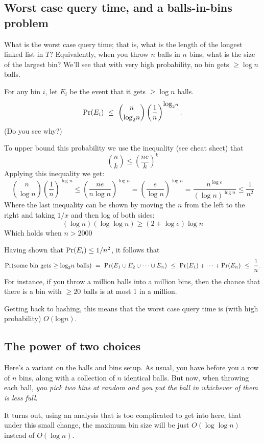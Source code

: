 \subsection{Worst case query time, and a balls-in-bins problem}

What is the worst case query time; that is, what is the length of the
longest linked list in $T$? Equivalently, when you throw $n$ balls in
$n$ bins, what is the size of the largest bin? We'll see that with
very high probability, no bin gets $\geq \log n$ balls.

For any bin $i$, let $E_i$ be the event that it gets $\geq \log n$ balls.
$$ \mbox{\rm Pr}(E_i) \  \leq \ {n \choose \mbox{log}_2 n} \left( \frac{1}{n} \right)^{\mbox{log}_2 n} .$$
(Do you see why?) 

To upper bound this probability we use the inequality (see cheat sheet) that
\[
{n \choose k} \leq \left( \frac{ne}{k} \right)^k
\]
Applying this inequality we get:
\[
{n \choose \log n} \left( \frac{1}{n} \right)^{\log n} \leq 
\left( \frac{ne}{n \log n}  \right)^{\log n} =
\left( \frac{e}{\log n}  \right)^{\log n} =
\frac{n^{\log e}}{(\log n)^{\log n}} \leq \frac{1}{n^2}
\]
Where the last inequality can be shown by moving the $n$ from the left
to the right and taking $1/x$ and then log of both sides:
\[
(\log n)(\log \log n) \geq (2+\log e) \log n
\]
Which holds when $n>2000$

Having shown that $\mbox{\rm Pr}(E_i) \leq 1/n^2$, it follows that
$$ \pr(\mbox{some bin gets $\geq \log n$ balls})
\ = \ 
\pr(E_1 \cup E_2 \cup \cdots \cup E_n)
\ \leq \ 
\pr(E_1) + \cdots + \pr(E_n) 
\ \leq \ 
\frac{1}{n}.
$$
For instance, if you throw a million balls into a million bins, then the chance that
there is a bin with $\geq 20$ balls is at most 1 in a million.

Getting back to hashing, this means that the worst case query time is (with high
probability) $O(\mbox{log} n)$.

\subsection{The power of two choices}

Here's a variant on the balls and bins setup. As usual, you have before you a 
row of $n$ bins, along with a collection of $n$ identical balls. But now, 
when throwing each ball, {\it you pick two bins at random and you put the
ball in whichever of them is less full}.

It turns out, using an analysis that is too complicated to get into here, that
under this small change, the maximum bin size will be just $O(\log \log n)$ 
instead of $O(\log n)$.

